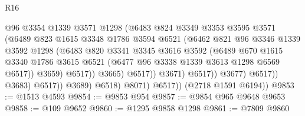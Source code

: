 \begin{lexlean}{R16}
\begin{coremodule}
                                      @96
                                      @3354
                                      @1339
                                      @3571
                                      @1298
                                      (@6483
                                        @824
                                        @3349
                                        @3353
                                        @3595
                                        @3571
                                        (@6489
                                          @823
                                          @1615
                                          @3348
                                          @1786
                                          @3594
                                          @6521
                                          (@6462
                                            @821
                                            @96
                                            @3346
                                            @1339
                                            @3592
                                            @1298
                                            (@6483
                                              @820
                                              @3341
                                              @3345
                                              @3616
                                              @3592
                                              (@6489
                                                @670
                                                @1615
                                                @3340
                                                @1786
                                                @3615
                                                @6521
                                                (@6477 @96 @3338 @1339 @3613 @1298 @6569 @6517))
                                              @3659)
                                            @6517))
                                        @3665)
                                      @6517))
                                  @3671)
                                @6517))
                            @3677)
                          @6517))
                      @3683)
                    @6517))
                @3689)
              @6518)
            @8071)
          @6517))
      (@2718 @1591 @6194))
@9853 := @1513 @4593
@9854 := @9853 @954
@9857 := @9854 @965 @9648 @9653
@9858 := @109 @9652
@9860 := @1295 @9858 @1298
@9861 := @7809 @9860

\end{coremodule}
\end{lexlean}
